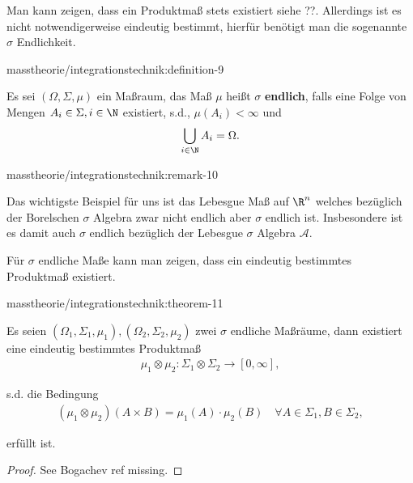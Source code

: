 \documentclass[letterpaper,10pt,german]{jupyterBook}
\begin{document}
\par
Man kann zeigen, dass ein Produktmaß stets existiert siehe ??. Allerdings ist es nicht notwendigerweise eindeutig bestimmt, hierfür benötigt man die sogenannte \(\sigma\) Endlichkeit.
\begin{definition}{}{masstheorie/integrationstechnik:definition-9}



\par
Es sei \((\Omega,\Sigma,\mu)\) ein Maßraum, das Maß \(\mu\) heißt \(\sigma\)\textbf{ endlich}, falls eine Folge von Mengen \(A_i\in\Sigma,i\in\N\) existiert, s.d., \(\mu(A_i)<\infty\) und
\begin{align*}
\bigcup_{i\in\N} A_i = \Omega.
\end{align*}\end{definition}
\begin{remark}{}{masstheorie/integrationstechnik:remark-10}



\par
Das wichtigste Beispiel für uns ist das Lebesgue Maß auf \(\R^n\) welches bezüglich der Borelschen \(\sigma\) Algebra zwar nicht endlich aber \(\sigma\) endlich ist. Insbesondere ist es damit auch \(\sigma\) endlich bezüglich der Lebesgue \(\sigma\) Algebra \(\mathcal{A}\).
\end{remark}

\par
Für \(\sigma\) endliche Maße kann man zeigen, dass ein eindeutig bestimmtes Produktmaß existiert.
\begin{theorem}{}{masstheorie/integrationstechnik:theorem-11}



\par
Es seien \((\Omega_1,\Sigma_1,\mu_1), (\Omega_2,\Sigma_2,\mu_2)\) zwei \(\sigma\) endliche Maßräume, dann existiert eine eindeutig bestimmtes Produktmaß
\begin{align*}
\mu_1\otimes \mu_2:\Sigma_1\otimes\Sigma_2\to[0,\infty],
\end{align*}
\par
s.d. die Bedingung
\begin{align*}
(\mu_1\otimes\mu_2)(A\times B) = \mu_1(A)\cdot\mu_2(B)\quad\forall A\in\Sigma_1, B\in\Sigma_2,
\end{align*}
\par
erfüllt ist.
\end{theorem}

\begin{proof}
 See Bogachev ref missing.
\end{proof}
\end{document}
